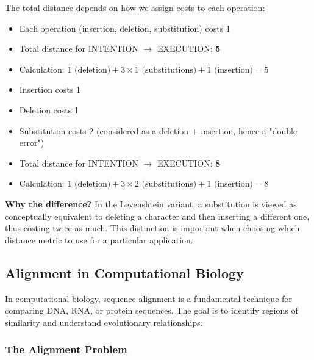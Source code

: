 \documentclass[11pt,a4paper]{article}
\theoremstyle{definition}
\theoremstyle{plain}
\theoremstyle{remark}
\begin{document}
The total distance depends on how we assign costs to each operation:

\begin{tcolorbox}[colback=green!5!white,colframe=green!75!black,title=\textbf{Standard Edit Distance (uniform costs)}]
\begin{itemize}
    \item Each operation (insertion, deletion, substitution) costs 1
    \item Total distance for INTENTION $\rightarrow$ EXECUTION: \textbf{5}
    \item Calculation: $1 \text{ (deletion)} + 3 \times 1 \text{ (substitutions)} + 1 \text{ (insertion)} = 5$
\end{itemize}
\end{tcolorbox}

\begin{tcolorbox}[colback=orange!5!white,colframe=orange!75!black,title=\textbf{Levenshtein Distance (weighted substitution)}]
\begin{itemize}
    \item Insertion costs 1
    \item Deletion costs 1
    \item Substitution costs 2 (considered as a deletion + insertion, hence a "double error")
    \item Total distance for INTENTION $\rightarrow$ EXECUTION: \textbf{8}
    \item Calculation: $1 \text{ (deletion)} + 3 \times 2 \text{ (substitutions)} + 1 \text{ (insertion)} = 8$
\end{itemize}
\end{tcolorbox}

\textbf{Why the difference?} In the Levenshtein variant, a substitution is viewed as conceptually equivalent to deleting a character and then inserting a different one, thus costing twice as much. This distinction is important when choosing which distance metric to use for a particular application.

\subsection{Alignment in Computational Biology}

In computational biology, sequence alignment is a fundamental technique for comparing DNA, RNA, or protein sequences. The goal is to identify regions of similarity and understand evolutionary relationships.

\subsubsection{The Alignment Problem}
\end{document}

